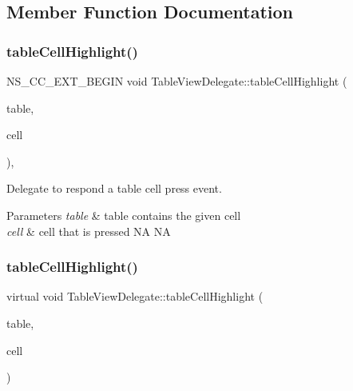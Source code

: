 \subsection{Member Function Documentation}
\mbox{\label{classTableViewDelegate_a5e6ad4549d76fcd3b11925c062322188}} 
\subsubsection{\texorpdfstring{table\+Cell\+Highlight()}{tableCellHighlight()}\hspace{0.1cm}{\footnotesize\ttfamily [1/2]}}
{\footnotesize\ttfamily N\+S\+\_\+\+C\+C\+\_\+\+E\+X\+T\+\_\+\+B\+E\+G\+IN void Table\+View\+Delegate\+::table\+Cell\+Highlight (\begin{DoxyParamCaption}\item[{\hyperlink{classTableView}{Table\+View} $\ast$}]{table,  }\item[{\hyperlink{classTableViewCell}{Table\+View\+Cell} $\ast$}]{cell }\end{DoxyParamCaption})\hspace{0.3cm}{\ttfamily [inline]}, {\ttfamily [virtual]}}

Delegate to respond a table cell press event.


\begin{DoxyParams}{Parameters}
{\em table} & table contains the given cell \\
\hline
{\em cell} & cell that is pressed  NA  NA \\
\hline
\end{DoxyParams}
\mbox{\label{classTableViewDelegate_a59258317ca789fc5a482194086ab922a}} 
\subsubsection{\texorpdfstring{table\+Cell\+Highlight()}{tableCellHighlight()}\hspace{0.1cm}{\footnotesize\ttfamily [2/2]}}
{\footnotesize\ttfamily virtual void Table\+View\+Delegate\+::table\+Cell\+Highlight (\begin{DoxyParamCaption}\item[{\hyperlink{classTableView}{Table\+View} $\ast$}]{table,  }\item[{\hyperlink{classTableViewCell}{Table\+View\+Cell} $\ast$}]{cell }\end{DoxyParamCaption})\hspace{0.3cm}{\ttfamily [virtual]}}

